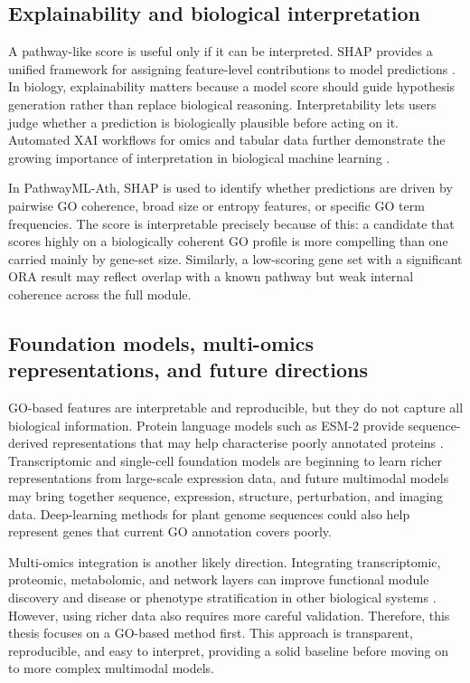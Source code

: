 \documentclass[12pt,twoside]{article}
\begin{document}
\subsection{Explainability and biological interpretation}
\label{sec:lit_xai}

A pathway-like score is useful only if it can be interpreted. SHAP provides a unified framework for assigning feature-level contributions to model predictions \citep{lundberg2017unified}. In biology, explainability matters because a model score should guide hypothesis generation rather than replace biological reasoning. Interpretability lets users judge whether a prediction is biologically plausible before acting on it. Automated XAI workflows for omics and tabular data further demonstrate the growing importance of interpretation in biological machine learning \citep{strudwick2025autoxai4omics}.

In PathwayML-Ath, SHAP is used to identify whether predictions are driven by pairwise GO coherence, broad size or entropy features, or specific GO term frequencies. The score is interpretable precisely because of this: a candidate that scores highly on a biologically coherent GO profile is more compelling than one carried mainly by gene-set size. Similarly, a low-scoring gene set with a significant ORA result may reflect overlap with a known pathway but weak internal coherence across the full module.

\subsection{Foundation models, multi-omics representations, and future directions}
\label{sec:lit_future}

GO-based features are interpretable and reproducible, but they do not capture all biological information. Protein language models such as ESM-2 provide sequence-derived representations that may help characterise poorly annotated proteins \citep{lin2023evolutionary}. Transcriptomic and single-cell foundation models are beginning to learn richer representations from large-scale expression data, and future multimodal models may bring together sequence, expression, structure, perturbation, and imaging data. Deep-learning methods for plant genome sequences could also help represent genes that current GO annotation covers poorly.

Multi-omics integration is another likely direction. Integrating transcriptomic, proteomic, metabolomic, and network layers can improve functional module discovery and disease or phenotype stratification in other biological systems \citep{hasin2017multiomics}. However, using richer data also requires more careful validation. Therefore, this thesis focuses on a GO-based method first. This approach is transparent, reproducible, and easy to interpret, providing a solid baseline before moving on to more complex multimodal models.
\end{document}
